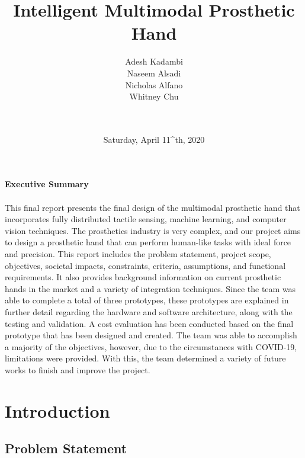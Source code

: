 \documentclass[11.5pt]{article}
\title{ \textbf{Intelligent Multimodal Prosthetic Hand}}
\author{
	\begin{tabular}{r l l}
	    Adesh Kadambi \\
	    Naseem Alsadi \\
        Nicholas Alfano \\
        Whitney Chu \\\\
	\end{tabular}
	\\
}
\date{Saturday, April 11^{th}, 2020}
\begin{document}
\begin{titlepage}
    \centering
    \maketitle
    \thispagestyle{empty}
\end{titlepage}

\pagebreak



\newpage
\thispagestyle{empty}
\textbf{Executive Summary}
\\\\
This final report presents the final design of the multimodal prosthetic hand that incorporates fully distributed tactile sensing, machine learning, and computer vision techniques. The prosthetics industry is very complex, and our project aims to design a prosthetic hand that can perform human-like tasks with ideal force and precision. This report includes the problem statement, project scope, objectives, societal impacts, constraints, criteria, assumptions, and functional requirements. It also provides background information on current prosthetic hands in the market and a variety of integration techniques. Since the team was able to complete a total of three prototypes, these prototypes are explained in further detail regarding the hardware and software architecture, along with the testing and validation. A cost evaluation has been conducted based on the final prototype that has been designed and created. The team was able to accomplish a majority of the objectives, however, due to the circumstances with COVID-19, limitations were provided. With this, the team determined a variety of future works to finish and improve the project.

\newpage
\thispagestyle{empty}
\tableofcontents
\newpage
\listoffigures
\listoftables

\newpage
{}
\doublespacing

\section{Introduction}

\subsection{Problem Statement}
\end{document}
